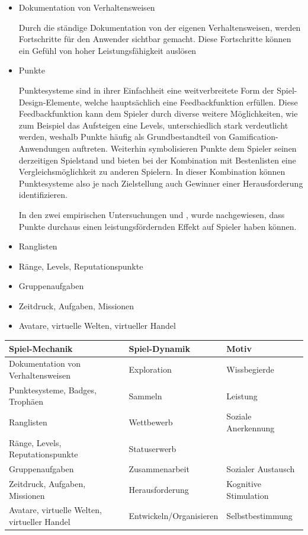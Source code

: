 \documentclass{scrreprt}
\begin{document}
\begin{itemize}
\item Dokumentation von Verhaltensweisen
\par Durch die ständige Dokumentation von der eigenen Verhaltensweisen, werden Fortschritte für den Anwender sichtbar gemacht. Diese Fortschritte können ein Gefühl von hoher Leistungsfähigkeit auslösen 
\item Punkte 
\par Punktesysteme sind in ihrer Einfachheit eine weitverbreitete Form der Spiel-Design-Elemente, welche hauptsächlich eine Feedbackfunktion erfüllen. Diese Feedbackfunktion kann dem Spieler durch diverse weitere Möglichkeiten, wie zum Beispiel das Aufsteigen eine Levels, unterschiedlich stark verdeutlicht werden, weshalb Punkte häufig als Grundbestandteil von Gamification-Anwendungen auftreten. Weiterhin symbolisieren Punkte dem Spieler seinen derzeitigen Spielstand und bieten bei der Kombination mit Bestenlisten eine Vergleichsmöglichkeit zu anderen Spielern. In dieser Kombination können Punktesysteme also je nach Zielstellung auch Gewinner einer Herausforderung identifizieren.
\par In den zwei empirischen Untersuchungen \citep{mekler2013disassembling} und \citep{mekler2013points}, wurde nachgewiesen, dass Punkte durchaus einen leistungsfördernden Effekt auf Spieler haben können.
\item Ranglisten 
\item Ränge, Levels, Reputationspunkte 
\item Gruppenaufgaben 
\item Zeitdruck, Aufgaben, Missionen 
\item Avatare, virtuelle Welten, virtueller Handel
\end{itemize}

\begin{tabularx}{\textwidth}{l|l|X}
	\toprule
	\textbf{Spiel-Mechanik} & \textbf{Spiel-Dynamik} & \textbf{Motiv}\\ \midrule
	Dokumentation von Verhaltensweisen & Exploration & Wissbegierde\\
	Punktesysteme, Badges, Trophäen & Sammeln  & Leistung\\
	Ranglisten & Wettbewerb & Soziale Anerkennung\\ 
	Ränge, Levels, Reputationspunkte & Statuserwerb  & \\
	Gruppenaufgaben & Zusammenarbeit  & Sozialer Austausch\\
	Zeitdruck, Aufgaben, Missionen & Herausforderung & Kognitive Stimulation\\ 
	Avatare, virtuelle Welten, virtueller Handel & Entwickeln/Organisieren & Selbstbestimmung \\ 
	\bottomrule
\end{tabularx}
\label{tab:spielDesignElemente}
\end{document}
